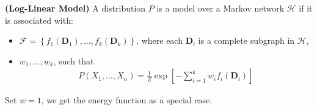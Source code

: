 \documentclass{article}
\newcommand{\bfs}[1]{\textbf{({#1}) }}
\begin{document}
 \begin{defa}\bfs{Log-Linear Model}\label{def:loglinear}
 A distribution $P$ is a  model over a Markov network $\mathcal{H}$ if it is associated with:
 \begin{itemize}
     \item {} $\mathcal{F}=\left\{f_{1}\left(\boldsymbol{D}_{1}\right), \ldots, f_{k}\left(\boldsymbol{D}_{k}\right)\right\}$, where each $\boldsymbol{D}_{i}$ is a complete subgraph in $\mathcal{H}$,
     \item {} $w_{1}, \ldots, w_{k}$,
such that
\begin{align*}
P\left(X_{1}, \ldots, X_{n}\right)=\frac{1}{Z} \exp \left[-\sum_{i=1}^{k} w_{i} f_{i}\left(\boldsymbol{D}_{i}\right)\right]
\end{align*}
 \end{itemize}
 \end{defa}
\begin{rema}
Set $w=1$, we get the  energy function as a special case.
\end{rema}
\end{document}
